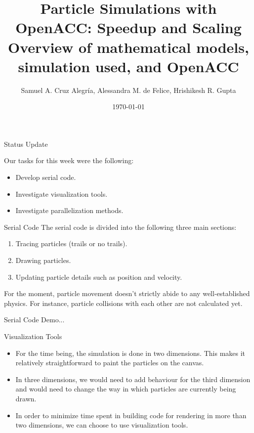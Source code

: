 \documentclass[aspectratio=169]{beamer}
\title[Particle Simulations with OpenACC]{\textbf{Particle Simulations with OpenACC: Speedup and Scaling}\\[0.5em] Overview of mathematical models, simulation used, and OpenACC}
\author{Samuel A. Cruz Alegr\'{i}a, Alessandra M. de Felice, Hrishikesh R. Gupta}
\institute{(University of Lugano)}
\date{\today}
\begin{document}
\begin{frame}
\titlepage
\end{frame}
\begin{frame}[fragile]{Status Update}

Our tasks for this week were the following:
%
\begin{itemize}
	\item Develop serial code.
	\item Investigate visualization tools.
	\item Investigate parallelization methods.
\end{itemize}
%

\end{frame}

\begin{frame}[fragile]{Serial Code}
	The serial code is divided into the following three main sections:
	\begin{enumerate}
		\item Tracing particles (trails or no trails).
		\item Drawing particles.
		\item Updating particle details such as position and velocity.
	\end{enumerate}
	
	For the moment, particle movement doesn't strictly abide to any well-established physics. For instance, particle collisions with each other are not calculated yet.
\end{frame}

\begin{frame}[fragile]{Serial Code}
	Demo...
\end{frame}

\begin{frame}[fragile]{Visualization Tools}
	\begin{itemize}
		\item For the time being, the simulation is done in two dimensions. This makes it relatively straightforward to paint the particles on the canvas.
		\item In three dimensions, we would need to add behaviour for the third dimension and would need to change the way in which particles are currently being drawn.
		\item In order to minimize time spent in building code for rendering in more than two dimensions, we can choose to use visualization tools.
	\end{itemize}
\end{frame}
\end{document}

